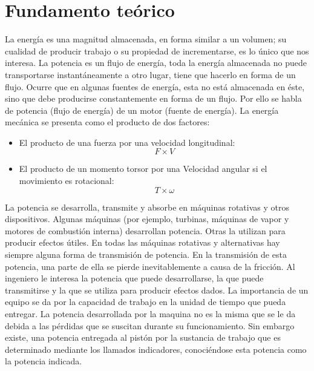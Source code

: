 \documentclass[a4paper,12pt]{report}
\begin{document}
\chapter{Fundamento teórico}
La energía es una magnitud almacenada, en forma similar a un volumen; su cualidad de producir trabajo o su propiedad de incrementarse, es lo único que nos interesa. La potencia es un flujo de energía, toda la energía almacenada no puede transportarse instantáneamente a otro lugar, tiene que hacerlo en forma de un flujo. Ocurre que en algunas fuentes de energía, esta no está almacenada en éste, sino que debe producirse constantemente en forma de un flujo. Por ello se habla de potencia (flujo de energía) de un motor (fuente de energía).
La energía mecánica se presenta como el producto de dos factores:
\begin{itemize}
\item El producto de una fuerza por una velocidad longitudinal: $$F \times V$$
\item El producto de un momento torsor por una Velocidad angular si el movimiento es rotacional: $$T \times \omega$$ 
\end{itemize}
La potencia se desarrolla, transmite y absorbe en máquinas rotativas y otros dispositivos. Algunas máquinas (por ejemplo, turbinas, máquinas de vapor y motores de combustión interna) desarrollan potencia. Otras la utilizan para producir efectos útiles. En todas las máquinas rotativas y alternativas hay siempre alguna forma de transmisión de potencia. En la transmisión de esta potencia, una parte de ella se pierde inevitablemente a causa de la fricción. Al ingeniero le interesa la potencia que puede desarrollarse, la que puede transmitirse y la que se utiliza para producir efectos dados. La importancia de un equipo se da por la capacidad de trabajo en la unidad de tiempo que pueda entregar.
La potencia desarrollada por la maquina no es la misma que se le da debida a las pérdidas  que se suscitan durante su funcionamiento. Sin embargo existe, una potencia entregada al pistón por la sustancia de trabajo que es determinado mediante los llamados indicadores, conociéndose esta potencia como la potencia indicada.
\end{document}
